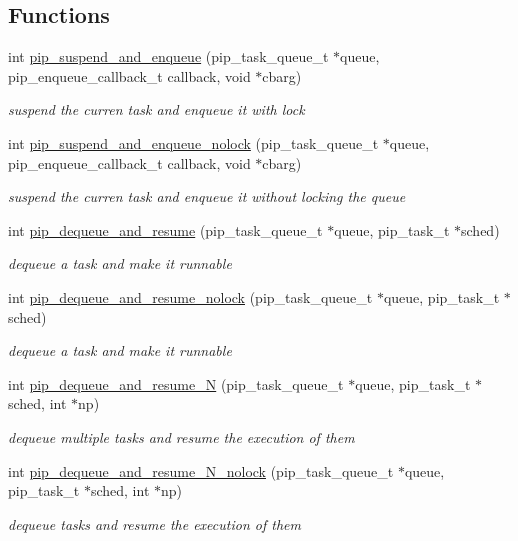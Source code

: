 \documentclass[twoside]{book}
\begin{document}
\subsection*{Functions}
\begin{DoxyCompactItemize}
\item 
int \hyperlink{group__ulp-2-suspension_ga7dbf7e64e78cd00ef62c3bb04f289a68}{pip\-\_\-suspend\-\_\-and\-\_\-enqueue} (pip\-\_\-task\-\_\-queue\-\_\-t $\ast$queue, pip\-\_\-enqueue\-\_\-callback\-\_\-t callback, void $\ast$cbarg)
\begin{DoxyCompactList}\small\item\em suspend the curren task and enqueue it with lock \end{DoxyCompactList}\item 
int \hyperlink{group__ulp-2-suspension_gab78d289ab89fa2981f2910849b1b2df7}{pip\-\_\-suspend\-\_\-and\-\_\-enqueue\-\_\-nolock} (pip\-\_\-task\-\_\-queue\-\_\-t $\ast$queue, pip\-\_\-enqueue\-\_\-callback\-\_\-t callback, void $\ast$cbarg)
\begin{DoxyCompactList}\small\item\em suspend the curren task and enqueue it without locking the queue \end{DoxyCompactList}\item 
int \hyperlink{group__ulp-2-suspension_gaaff299f195e2397f17cf11016c8a394f}{pip\-\_\-dequeue\-\_\-and\-\_\-resume} (pip\-\_\-task\-\_\-queue\-\_\-t $\ast$queue, pip\-\_\-task\-\_\-t $\ast$sched)
\begin{DoxyCompactList}\small\item\em dequeue a task and make it runnable \end{DoxyCompactList}\item 
int \hyperlink{group__ulp-2-suspension_gab3c26770ac6de70ad11239dc301bd403}{pip\-\_\-dequeue\-\_\-and\-\_\-resume\-\_\-nolock} (pip\-\_\-task\-\_\-queue\-\_\-t $\ast$queue, pip\-\_\-task\-\_\-t $\ast$sched)
\begin{DoxyCompactList}\small\item\em dequeue a task and make it runnable \end{DoxyCompactList}\item 
int \hyperlink{group__ulp-2-suspension_gac26e54557d8e89fcdcb52a9df6c65998}{pip\-\_\-dequeue\-\_\-and\-\_\-resume\-\_\-\-N} (pip\-\_\-task\-\_\-queue\-\_\-t $\ast$queue, pip\-\_\-task\-\_\-t $\ast$sched, int $\ast$np)
\begin{DoxyCompactList}\small\item\em dequeue multiple tasks and resume the execution of them \end{DoxyCompactList}\item 
int \hyperlink{group__ulp-2-suspension_ga939e70924803be491c2f6f10b364e803}{pip\-\_\-dequeue\-\_\-and\-\_\-resume\-\_\-\-N\-\_\-nolock} (pip\-\_\-task\-\_\-queue\-\_\-t $\ast$queue, pip\-\_\-task\-\_\-t $\ast$sched, int $\ast$np)
\begin{DoxyCompactList}\small\item\em dequeue tasks and resume the execution of them \end{DoxyCompactList}\end{DoxyCompactItemize}
\end{document}
